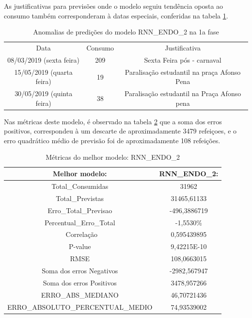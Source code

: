         As justificativas para previsões onde o modelo seguiu tendência oposta ao consumo também corresponderam à datas especiais, conferidas na tabela \ref{table:rnn_endo_2_red}.
            \begin{table}[!ht]
                \caption{Anomalias de predições do modelo RNN\_ENDO\_2 na 1a fase}
                \label{table:rnn_endo_2_red}
                 \begin{tabular}{|c|c|c|}
                 \rowcolor{gray!50}
                 \hline
                Data & Consumo & Justificativa \\
                08/03/2019 (sexta feira)   & 209 &Sexta Feira pós - carnaval\\
                15/05/2019 (quarta feira)   & 19  & Paralisação estudantil na praça Afonso Pena\\
                30/05/2019 (quinta feira)   &  38  & Paralisação estudantil na Praça Afonso pena\\
                \hline 
                \end{tabular} 
            \end{table}
        
        Nas métricas deste modelo, é observado na tabela \ref{table:rnn_endo_2_test} que a soma dos erros positivos, correspondeu à um descarte de aproximadamente 3479 refeiçoes, e o erro quadrático médio de previsão foi de aproximadamente 108 refeições.
            \begin{table}[!ht]
                \centering
                \caption{Métricas do melhor modelo:  RNN\_ENDO\_2 }
                \label{table:rnn_endo_2_test}
                \begin{tabular}{|c|c|}
                \rowcolor{gray!50}
                \hline
                Melhor modelo: &   RNN\_ENDO\_2: \\ \hline
                Total\_Consumidas & 31962 \\ 
                Total\_Previstas & 31465,61133 \\
                Erro\_Total\_Previsao & -496,3886719 \\
                Percentual\_Erro\_Total & -1,5530\% \\\
                Correlação & 0,595439895 \\
                P-value & 9,42215E-10    \\
                RMSE &  108,0663015\\
                Soma dos erros Negativos & -2982,567947 \\
                Soma dos erros Positivos & 3478,957266\\
                ERRO\_ABS\_MEDIANO & 46,70721436 \\ 
                ERRO\_ABSOLUTO\_PERCENTUAL\_MEDIO & 74,93539002 \\ 
                \hline
                \end{tabular}
            \end{table}
        
